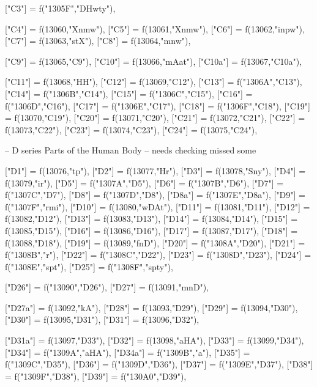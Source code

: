 \documentclass{article}
\begin{document}
\begin{luacode*}
{	["C3"] = f("1305F","DHwty"),

	["C4"] = f(13060,"Xnmw"),
	["C5"] = f(13061,"Xnmw"),
	["C6"] = f(13062,"inpw"),
	["C7"] = f(13063,"stX"),
	["C8"] = f(13064,"mnw"),

   ["C9"]  = f(13065,"C9"),  
	["C10"] = f(13066,"mAat"),
	["C10a"] = f(13067,"C10a"),

	["C11"] = f(13068,"HH"),
	["C12"] = f(13069,"C12"),
	["C13"] = f("1306A","C13"),
	["C14"] = f("1306B","C14"),
	["C15"] = f("1306C","C15"),
	["C16"] = f("1306D","C16"),
	["C17"] = f("1306E","C17"),
	["C18"] = f("1306F","C18"),
	["C19"] = f(13070,"C19"),
	["C20"] = f(13071,"C20"),
	["C21"] = f(13072,"C21"),
	["C22"] = f(13073,"C22"),
	["C23"] = f(13074,"C23"),
	["C24"] = f(13075,"C24"),

-- D series Parts of the Human Body
-- needs checking missed some

	["D1"] = f(13076,"tp"),
	["D2"] = f(13077,"Hr"),
	["D3"] = f(13078,"Sny"),
	["D4"] = f(13079,"ir"),
	["D5"] = f("1307A","D5"),
	["D6"] = f("1307B","D6"),
	["D7"] = f("1307C","D7"),
	["D8"] = f("1307D","D8"),
	["D8a"] = f("1307E","D8a"),
	["D9"] = f("1307F","rmi"),
	["D10"] = f(13080,"wDAt"),
	["D11"] = f(13081,"D11"),
	["D12"] = f(13082,"D12"),
	["D13"] = f(13083,"D13"),
	["D14"] = f(13084,"D14"),
	["D15"] = f(13085,"D15"),
	["D16"] = f(13086,"D16"),
	["D17"] = f(13087,"D17"),
	["D18"] = f(13088,"D18"),
	["D19"] = f(13089,"fnD"),
	["D20"] = f("1308A","D20"),
	["D21"] = f("1308B","r"),
	["D22"] = f("1308C","D22"),
	["D23"] = f("1308D","D23"),
	["D24"] = f("1308E","spt"),
	["D25"] = f("1308F","spty"),

	["D26"] = f("13090","D26"),
	["D27"] = f(13091,"mnD"),

	["D27a"] = f(13092,"kA"),
	["D28"] = f(13093,"D29"),
	["D29"] = f(13094,"D30"),
	["D30"] = f(13095,"D31"),
	["D31"] = f(13096,"D32"),
  
	["D31a"] = f(13097,"D33"),
	["D32"] = f(13098,"aHA"),
	["D33"] = f(13099,"D34"),
	["D34"] = f("1309A","aHA"),
	["D34a"] = f("1309B","a"),
	["D35"] = f("1309C","D35"),
	["D36"] = f("1309D","D36"),
	["D37"] = f("1309E","D37"),
	["D38"] = f("1309F","D38"),
	["D39"] = f("130A0","D39"),

}
\end{luacode*}
\end{document}
